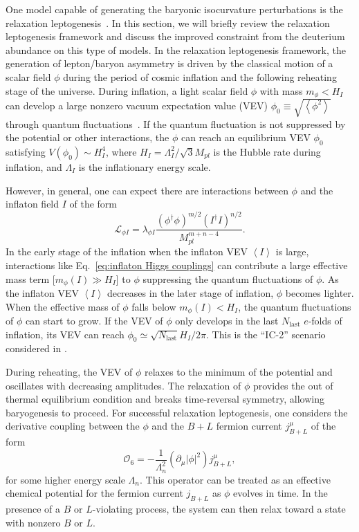\documentclass[11pt,a4paper]{article}
\begin{document}
One model capable of generating the baryonic isocurvature perturbations is the relaxation leptogenesis~\cite{Kusenko:2014lra,Pearce:2015nga,Yang:2015ida}. In this section, we will briefly review the relaxation leptogenesis framework and discuss the improved constraint from the deuterium abundance on this type of models. In the relaxation leptogenesis framework, the generation of lepton/baryon asymmetry is driven by the classical motion of a scalar field $\phi$ during the period of cosmic inflation and the following reheating stage of the universe. During inflation, a light scalar field $\phi$ with mass $m_{\phi}<H_{I}$ can develop a large nonzero vacuum expectation value (VEV) $\phi_{0}\equiv\sqrt{\left\langle \phi^{2}\right\rangle }$ through quantum fluctuations~\cite{Linde:1982uu,Starobinsky:1982ee,Vilenkin:1982wt}. If the quantum fluctuation is not suppressed by the potential or other interactions, the $\phi$ can reach an equilibrium VEV $\phi_{0}$ satisfying $V\left(\phi_{0}\right)\sim H_{I}^{4}$, where $H_{I}=\Lambda_{I}^{2}/\sqrt{3}M_{pl}$ is the Hubble rate during inflation, and $\Lambda_{I}$ is the inflationary energy scale.

However, in general, one can expect there are interactions between $\phi$ and the inflaton field $I$ of the form 
\begin{equation}
\mathcal{L}_{\phi I}=\lambda_{\phi I}\frac{\left(\phi^{\dagger}\phi\right)^{m/2}\left(I^{\dagger}I\right)^{n/2}}{M_{pl}^{m+n-4}}.\label{eq:inflaton Higgs couplings}
\end{equation}
In the early stage of the inflation when the inflaton VEV $\left\langle I\right\rangle $ is large, interactions like Eq.~\eqref{eq:inflaton Higgs couplings} can contribute a large effective mass term {[}$m_{\phi}\left(I\right)\gg H_{I}${]} to $\phi$ suppressing the quantum fluctuations of $\phi$. As the inflaton VEV $\left\langle I\right\rangle $ decreases in the later stage of inflation, $\phi$ becomes lighter. When the effective mass of $\phi$ falls below $m_{\phi}\left(I\right)<H_{I}$, the quantum fluctuations of $\phi$ can start to grow. If the VEV of $\phi$ only develops in the last $N_{\mathrm{last}}$ $e$-folds of inflation, its VEV can reach $\phi_{0}\simeq\sqrt{N_{\mathrm{last}}}H_{I}/2\pi$. This is the ``IC-2'' scenario considered in \cite{Kusenko:2014lra,Yang:2015ida}.

During reheating, the VEV of $\phi$ relaxes to the minimum of the potential and oscillates with decreasing amplitudes. The relaxation of $\phi$ provides the out of thermal equilibrium condition and breaks time-reversal symmetry, allowing baryogenesis to proceed. For successful relaxation leptogenesis, one considers the derivative coupling between the $\phi$ and the $B+L$ fermion current $j_{B+L}^{\mu}$ of the form 
\begin{equation}
\mathcal{O}_{6}=-\frac{1}{\Lambda_{n}^{2}}\left(\partial_{\mu}\left|\phi\right|^{2}\right)j_{B+L}^{\mu},
\end{equation}
for some higher energy scale $\Lambda_{n}$. This operator can be treated as an effective chemical potential for the fermion current $j_{B+L}$ as $\phi$ evolves in time. In the presence of a $B$ or $L$-violating process, the system can then relax toward a state with nonzero $B$ or $L$.
\end{document}
